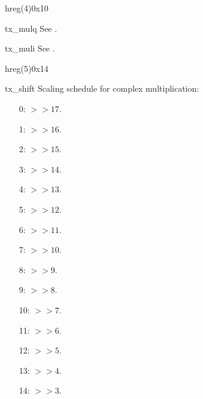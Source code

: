 \documentclass[11pt,technote,a4paper,onecolumn,dvips]{IEEEtran}
\begin{document}
\begin{register}{h}{reg(4)}{0x10}%
    \label{reg4}%
    \regnewline%
    \begin{regdesc}\begin{reglist}[tx\_mulq]
        \item[tx\_mulq] See .
        \item[tx\_muli] See .
    \end{reglist}\end{regdesc}
\end{register}
\begin{register}{h}{reg(5)}{0x14}%
    \label{reg5}%
    \regnewline%
    \begin{regdesc}\begin{reglist}
        \item[tx\_shift] Scaling schedule for complex multiplication:
            \begin{itemize}
                \item[0:] $>> 17$.
                \item[1:] $>> 16$.
                \item[2:] $>> 15$.
                \item[3:] $>> 14$.
                \item[4:] $>> 13$.
                \item[5:] $>> 12$.
                \item[6:] $>> 11$.
                \item[7:] $>> 10$.
                \item[8:] $>> 9$.
                \item[9:] $>> 8$.
                \item[10:] $>> 7$.
                \item[11:] $>> 6$.
                \item[12:] $>> 5$.
                \item[13:] $>> 4$.
                \item[14:] $>> 3$.

\end{itemize}
\end{reglist}
\end{regdesc}
\end{register}
\end{document}
